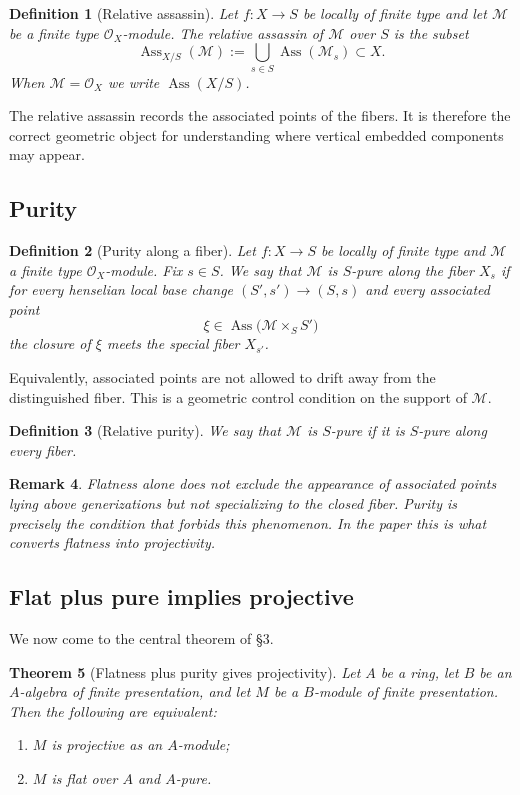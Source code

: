 \documentclass[11pt,oneside]{article}
\newtheorem{theorem}{Theorem}[section]
\newtheorem{definition}[theorem]{Definition}
\newtheorem{remark}[theorem]{Remark}
\newcommand{\M}{\mathcal M}
\newcommand{\OO}{\mathcal O}
\newcommand{\Ass}{\operatorname{Ass}}
\begin{document}
\begin{definition}[Relative assassin]
Let $f\colon X\to S$ be locally of finite type and let $\M$ be a finite type $\OO_X$-module.  The \emph{relative assassin} of $\M$ over $S$ is the subset
\[
\Ass_{X/S}(\M):=\bigcup_{s\in S}\Ass(\M_s)\subset X.
\]
When $\M=\OO_X$ we write $\Ass(X/S)$.
\end{definition}

The relative assassin records the associated points of the fibers.  It is therefore the correct geometric object for understanding where vertical embedded components may appear.

\subsection{Purity}

\begin{definition}[Purity along a fiber]\label{def:purity}
Let $f\colon X\to S$ be locally of finite type and $\M$ a finite type $\OO_X$-module.  Fix $s\in S$.  We say that $\M$ is \emph{$S$-pure along the fiber $X_s$} if for every henselian local base change $(S',s')\to(S,s)$ and every associated point
\[
\xi\in \Ass\bigl(\M\times_S S'\bigr)
\]
the closure of $\xi$ meets the special fiber $X_{s'}$.
\end{definition}

Equivalently, associated points are not allowed to drift away from the distinguished fiber.  This is a geometric control condition on the support of $\M$.

\begin{definition}[Relative purity]
We say that $\M$ is \emph{$S$-pure} if it is $S$-pure along every fiber.
\end{definition}

\begin{remark}
Flatness alone does not exclude the appearance of associated points lying above generizations but not specializing to the closed fiber.  Purity is precisely the condition that forbids this phenomenon.  In the paper this is what converts flatness into projectivity.
\end{remark}

\subsection{Flat plus pure implies projective}

We now come to the central theorem of \S3.

\begin{theorem}[Flatness plus purity gives projectivity]\label{thm:flat-pure-projective}
Let $A$ be a ring, let $B$ be an $A$-algebra of finite presentation, and let $M$ be a $B$-module of finite presentation.  Then the following are equivalent:
\begin{enumerate}[label=\textup{(\roman*)}]
  \item $M$ is projective as an $A$-module;
  \item $M$ is flat over $A$ and $A$-pure.
\end{enumerate}
\end{theorem}
\end{document}
